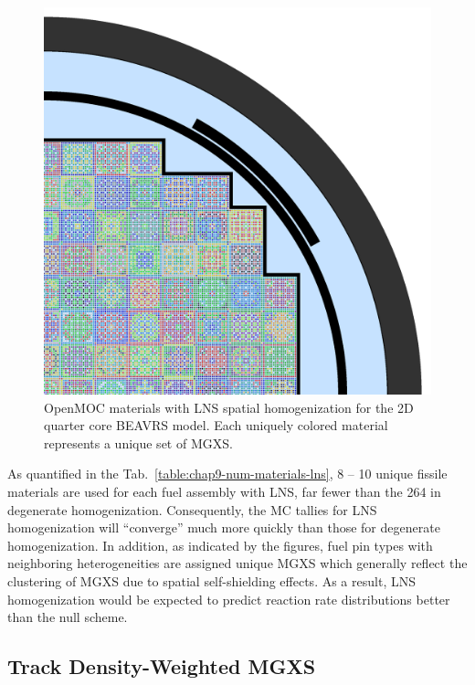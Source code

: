 \begin{figure}[h!]
\centering
\includegraphics[width=\linewidth]{figures/patterns/lns/full-core/materials}
\vspace{2mm}
\caption[Depiction of LNS spatially homogenized materials for BEAVRS]{OpenMOC materials with \ac{LNS} spatial homogenization for the 2D quarter core \ac{BEAVRS} model. Each uniquely colored material represents a unique set of \ac{MGXS}.}
\label{fig:chap9-lns-materials-beavrs}
\end{figure}

As quantified in the Tab.~\ref{table:chap9-num-materials-lns}, 8 -- 10 unique fissile materials are used for each fuel assembly with \ac{LNS}, far fewer than the 264 in degenerate homogenization. Consequently, the \ac{MC} tallies for \ac{LNS} homogenization will ``converge'' much more quickly than those for degenerate homogenization. In addition, as indicated by the figures, fuel pin types with neighboring heterogeneities are assigned unique \ac{MGXS} which generally reflect the clustering of \ac{MGXS} due to spatial self-shielding effects. As a result, \ac{LNS} homogenization would be expected to predict reaction rate distributions better than the null scheme. 

\subsection{Track Density-Weighted MGXS}
\label{subsec:chap9-lns-math}

